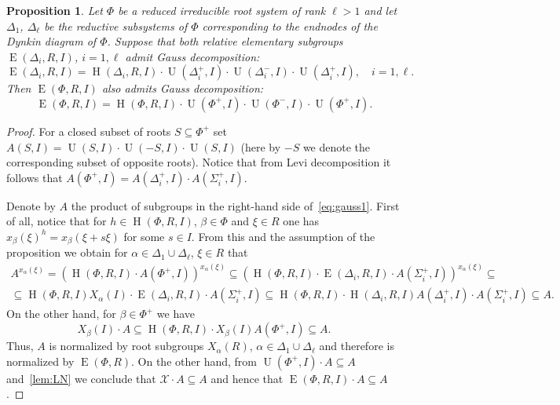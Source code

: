 \documentclass[11pt]{amsart}
\theoremstyle{plain}
\numberwithin{equation}{section}
\numberwithin{lemma}{section}
\newtheorem{prop}[lemma]{Proposition}
\theoremstyle{definition}
\theoremstyle{remark}
\DeclareMathOperator{\E}{E}
\DeclareMathOperator{\Hh}{H}
\DeclareMathOperator{\U}{U}
\begin{document}
\begin{prop} \label{thm:Gauss}
Let $\Phi$ be a reduced irreducible root system of rank $\ell > 1$ and let $\Delta_1$, $\Delta_\ell$ be
the reductive subsystems of $\Phi$ corresponding to the endnodes of the Dynkin diagram of $\Phi$.
Suppose that both relative elementary subgroups $\E(\Delta_i, R, I)$, $i=1, \ell$ admit Gauss decomposition:
\[ \E(\Delta_i, R, I) = \Hh(\Delta_i, R, I) \cdot \U(\Delta^+_i, I) \cdot \U(\Delta^-_i, I) \cdot \U(\Delta^+_i, I), \quad i=1, \ell. \]
Then $\E(\Phi, R, I)$ also admits Gauss decomposition:
\begin{equation} \label{eq:gauss1} \E(\Phi, R, I) = \Hh(\Phi, R, I) \cdot \U(\Phi^+, I) \cdot \U(\Phi^-, I) \cdot \U(\Phi^+, I). \end{equation}
\end{prop}
\begin{proof}
For a closed subset of roots $S \subseteq \Phi^+$ set $A(S, I) = \U(S, I) \cdot \U(-S, I) \cdot \U(S, I)$ (here by $-S$ we denote the corresponding subset of opposite roots).
Notice that from Levi decomposition it follows that $A(\Phi^+, I) = A(\Delta_i^+, I) \cdot A(\Sigma_i^+, I)$.

Denote by $A$ the product of subgroups in the right-hand side of~\eqref{eq:gauss1}.
First of all, notice that for $h \in \Hh(\Phi, R, I)$, $\beta \in \Phi$ and $\xi \in R$ one has $x_\beta(\xi)^h = x_\beta(\xi + s\xi)$ for some $s\in I$.
From this and the assumption of the proposition we obtain for $\alpha \in \Delta_1 \cup \Delta_\ell$, $\xi \in R$ that
\begin{multline} \nonumber
 A^{x_\alpha(\xi)} = (\Hh(\Phi, R, I) \cdot A(\Phi^+, I))^{x_\alpha(\xi)} \subseteq (\Hh(\Phi, R, I) \cdot \E(\Delta_i, R, I) \cdot A(\Sigma_i^+, I))^{x_\alpha(\xi)} \subseteq \\
  \subseteq \Hh(\Phi, R, I) X_{\alpha}(I) \cdot \E(\Delta_i, R, I) \cdot A(\Sigma_i^+, I) \subseteq \Hh(\Phi, R, I) \cdot \Hh(\Delta_i, R, I) A(\Delta_i^+, I) \cdot A(\Sigma_i^+, I) \subseteq A.
\end{multline}
On the other hand, for $\beta \in \Phi^+$ we have
\begin{equation} \nonumber
 X_{\beta}(I) \cdot A \subseteq \Hh(\Phi, R, I) \cdot X_{\beta}(I) A(\Phi^+, I) \subseteq A.
\end{equation}
Thus, $A$ is normalized by root subgroups $X_\alpha(R)$, $\alpha \in \Delta_1 \cup \Delta_\ell$ and therefore is normalized by $\E(\Phi, R)$.
On the other hand, from $\U(\Phi^+, I) \cdot A \subseteq A$ and~\cref{lem:LN} we conclude that $\mathcal{X} \cdot A \subseteq A$ and hence
 that $\E(\Phi, R, I) \cdot A \subseteq A$.
\end{proof}
\end{document}
